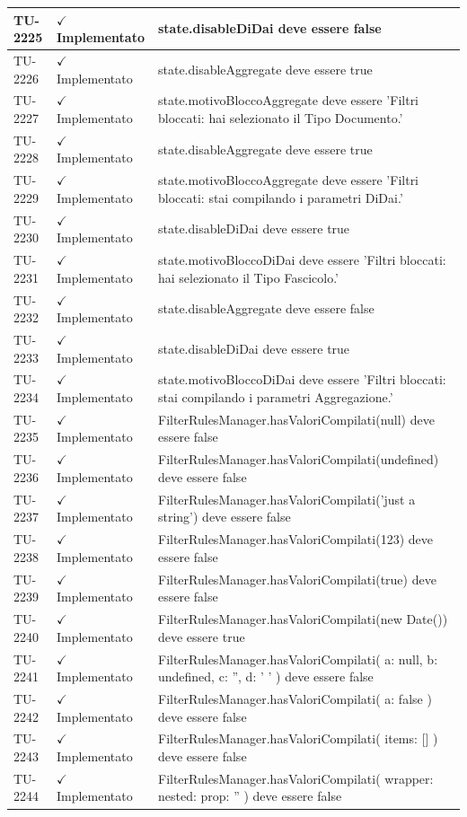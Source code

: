 ﻿\documentclass[a4paper,12pt]{article}
\newcommand{\ok}{\textcolor{green!60!black}{$\checkmark$ Implementato}}
\begin{document}
\begin{longtable}{|p{2cm}|p{3.5cm}|p{9.5cm}|}
\hline
TU-2225 & \ok & state.disableDiDai deve essere false \\
\hline
TU-2226 & \ok & state.disableAggregate deve essere true \\
\hline
TU-2227 & \ok & state.motivoBloccoAggregate deve essere 'Filtri bloccati: hai selezionato il Tipo Documento.' \\
\hline
TU-2228 & \ok & state.disableAggregate deve essere true \\
\hline
TU-2229 & \ok & state.motivoBloccoAggregate deve essere 'Filtri bloccati: stai compilando i parametri DiDai.' \\
\hline
TU-2230 & \ok & state.disableDiDai deve essere true \\
\hline
TU-2231 & \ok & state.motivoBloccoDiDai deve essere 'Filtri bloccati: hai selezionato il Tipo Fascicolo.' \\
\hline
TU-2232 & \ok & state.disableAggregate deve essere false \\
\hline
TU-2233 & \ok & state.disableDiDai deve essere true \\
\hline
TU-2234 & \ok & state.motivoBloccoDiDai deve essere 'Filtri bloccati: stai compilando i parametri Aggregazione.' \\
\hline
TU-2235 & \ok & FilterRulesManager.hasValoriCompilati(null) deve essere false \\
\hline
TU-2236 & \ok & FilterRulesManager.hasValoriCompilati(undefined) deve essere false \\
\hline
TU-2237 & \ok & FilterRulesManager.hasValoriCompilati('just a string') deve essere false \\
\hline
TU-2238 & \ok & FilterRulesManager.hasValoriCompilati(123) deve essere false \\
\hline
TU-2239 & \ok & FilterRulesManager.hasValoriCompilati(true) deve essere false \\
\hline
TU-2240 & \ok & FilterRulesManager.hasValoriCompilati(new Date()) deve essere true \\
\hline
TU-2241 & \ok & FilterRulesManager.hasValoriCompilati({ a: null, b: undefined, c: '', d: ' ' }) deve essere false \\
\hline
TU-2242 & \ok & FilterRulesManager.hasValoriCompilati({ a: false }) deve essere false \\
\hline
TU-2243 & \ok & FilterRulesManager.hasValoriCompilati({ items: [] }) deve essere false \\
\hline
TU-2244 & \ok & FilterRulesManager.hasValoriCompilati({ wrapper: { nested: { prop: '' } } }) deve essere false \\

\end{longtable}
\end{document}
